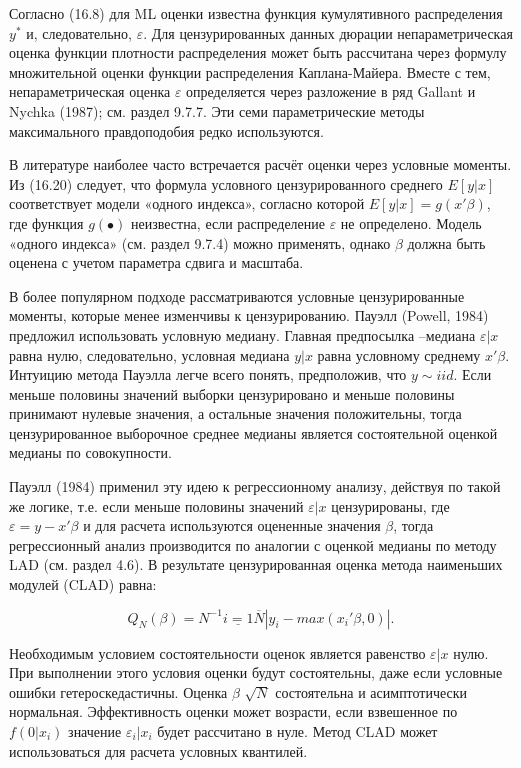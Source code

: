 Согласно (16.8) для ML оценки известна функция кумулятивного распределения $y^{*}$ и, следовательно, $\varepsilon$. Для цензурированных данных дюрации непараметрическая оценка функции плотности распределения может быть рассчитана через формулу множительной оценки функции распределения Каплана-Майера. Вместе с тем, непараметрическая оценка $\varepsilon$ определяется через разложение в ряд Gallant и Nychka (1987); см. раздел 9.7.7. Эти семи параметрические методы максимального правдоподобия редко используются.

В литературе наиболее часто встречается расчёт оценки через условные моменты. Из (16.20) следует, что формула условного цензурированного среднего $E[y|x]$ соответствует модели «одного индекса», согласно которой $E[y|x]=g(x'\beta)$, где функция $g(\bullet)$ неизвестна, если распределение $\varepsilon$ не определено. Модель «одного индекса» (см. раздел  9.7.4) можно применять, однако $\beta$ должна быть оценена с учетом параметра сдвига и масштаба. 

В более популярном подходе рассматриваются условные цензурированные моменты, которые менее изменчивы к цензурированию. Пауэлл (Powell, 1984) предложил использовать условную медиану. Главная предпосылка –медиана $\varepsilon|x$ равна нулю, следовательно, условная медиана $y|x$ равна условному среднему $x'\beta$. Интуицию метода Пауэлла легче всего понять, предположив, что $y{\sim}iid$. Если меньше половины значений выборки цензурировано и меньше половины принимают нулевые значения, а остальные значения положительны, тогда цензурированное выборочное среднее медианы является состоятельной оценкой медианы по совокупности.  


Пауэлл (1984) применил эту идею к регрессионному анализу, действуя по такой же логике, т.е. если меньше половины значений $\varepsilon|x$ цензурированы, где $\varepsilon=y-x'\beta$ и для расчета используются оцененные значения $\beta$, тогда регрессионный анализ производится по аналогии с оценкой медианы по методу LAD (см. раздел 4.6). В результате цензурированная оценка метода наименьших модулей (CLAD) равна:

\begin{equation} 
Q_N(\beta)=N^{-1}\underline{i=1}{\overline{N}{|y_i-max(x_i'\beta,0)|}}.
\end{equation}

Необходимым условием состоятельности оценок является равенство $\varepsilon|x$ нулю. При выполнении этого условия оценки будут состоятельны, даже если условные ошибки гетероскедастичны. Оценка $\beta$ $\sqrt{N}$ состоятельна и асимптотически нормальная. Эффективность оценки может возрасти, если взвешенное по $f(0|x_i)$ значение $\varepsilon_i|x_i$ будет рассчитано в нуле. Метод CLAD может использоваться для расчета условных квантилей.

